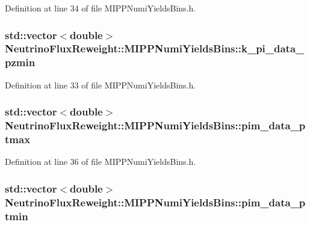 Definition at line 34 of file M\-I\-P\-P\-Numi\-Yields\-Bins.\-h.

\hypertarget{class_neutrino_flux_reweight_1_1_m_i_p_p_numi_yields_bins_a2184256a52d72a1674b7a7a595ad60c9}{
\subsubsection[{k\-\_\-pi\-\_\-data\-\_\-pzmin}]{\setlength{\rightskip}{0pt plus 5cm}std\-::vector$<$double$>$ Neutrino\-Flux\-Reweight\-::\-M\-I\-P\-P\-Numi\-Yields\-Bins\-::k\-\_\-pi\-\_\-data\-\_\-pzmin}}\label{class_neutrino_flux_reweight_1_1_m_i_p_p_numi_yields_bins_a2184256a52d72a1674b7a7a595ad60c9}


Definition at line 33 of file M\-I\-P\-P\-Numi\-Yields\-Bins.\-h.

\hypertarget{class_neutrino_flux_reweight_1_1_m_i_p_p_numi_yields_bins_a60a1e09716ccaec014d9ec25689b98be}{
\subsubsection[{pim\-\_\-data\-\_\-ptmax}]{\setlength{\rightskip}{0pt plus 5cm}std\-::vector$<$double$>$ Neutrino\-Flux\-Reweight\-::\-M\-I\-P\-P\-Numi\-Yields\-Bins\-::pim\-\_\-data\-\_\-ptmax}}\label{class_neutrino_flux_reweight_1_1_m_i_p_p_numi_yields_bins_a60a1e09716ccaec014d9ec25689b98be}


Definition at line 36 of file M\-I\-P\-P\-Numi\-Yields\-Bins.\-h.

\hypertarget{class_neutrino_flux_reweight_1_1_m_i_p_p_numi_yields_bins_a65177fce103ec850b5804f0ac3d0f5c4}{
\subsubsection[{pim\-\_\-data\-\_\-ptmin}]{\setlength{\rightskip}{0pt plus 5cm}std\-::vector$<$double$>$ Neutrino\-Flux\-Reweight\-::\-M\-I\-P\-P\-Numi\-Yields\-Bins\-::pim\-\_\-data\-\_\-ptmin}}\label{class_neutrino_flux_reweight_1_1_m_i_p_p_numi_yields_bins_a65177fce103ec850b5804f0ac3d0f5c4}


